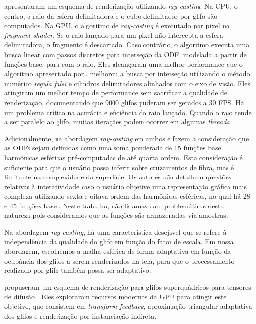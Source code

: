  apresentaram um esquema de renderização utilizando \textit{ray-casting}. Na CPU, o centro, o raio da esfera delimitadora e o cubo delimitador por glifo são computados. Na GPU, o algoritmo de \textit{ray-casting} é executado por pixel no \textit{fragment shader}. Se o raio lançado para um pixel não intercepta a esfera delimitadora, o fragmento é descartado. Caso contrário, o algoritmo executa uma busca linear com passos discretos para interseção da ODF, modelada a partir de funções base, para com o raio. Eles alcançaram uma melhor performance que o algoritmo apresentado por .  melhorou a busca por interseção utilizando o método numérico \textit{regula falsi} e cilindros delimitadores alinhados com o eixo de visão. Eles atingiram um melhor tempo de performance sem sacrificar a qualidade de renderização, documentando que 9000 glifos puderam ser gerados a 30 FPS. Há um problema crítico na acurácia e eficiência do raio lançado. Quando o raio tende a ser paralelo ao glifo, muitas iterações podem ocorrer em algumas \textit{threads}. 

Adicionalmente, na abordagem \textit{ray-casting} em ambos  e  fazem a consideração que as ODFs sejam definidas como uma soma ponderada de 15 funções base harmônicas esféricas pré-computadas de até quarta ordem. Esta consideração é suficiente para que o usuário possa inferir sobre cruzamentos de fibra, mas é limitante na complexidade da superfície. Os autores não detalham questões relativas à interatividade caso o usuário objetive uma representação gráfica mais complexa utilizando sexta e oitava ordem das harmônicas esféricas, no qual há 28 e 45 funções base \cite{descoteaux2007_QBI}. Neste trabalho, não lidamos com problemáticas desta natureza pois consideramos que as funções são armazenadas via amostras.

Na abordagem \textit{ray-casting}, há uma característica desejável que se refere à independência da qualidade do glifo em função do fator de escala. Em nossa abordagem, escolhemos a malha esférica de forma adaptativa em função da ocupância dos glifos a serem renderizados na tela, para que o processamento realizado por glifo também possa ser adaptativo.


 propuseram um esquema de renderização para glifos superquádricos para tensores de difusão \cite{Kindlmann2004}. Eles exploraram recursos modernos da GPU para atingir este objetivo, que consistem em \textit{transform feedback}, aproximação triangular adaptativa dos glifos e renderização por instanciação indireta.

